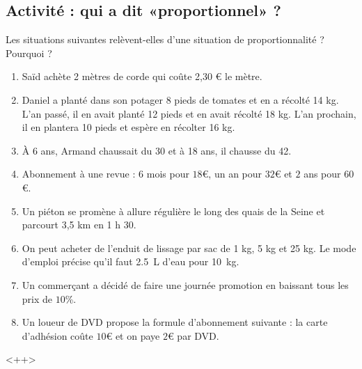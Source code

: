 
\subsection*{Activité : qui a dit «proportionnel» ?}

Les situations suivantes relèvent-elles d’une situation de proportionnalité ? Pourquoi ?
\begin{enumerate}
    \item

 Saïd achète 2 mètres de corde qui coûte 2,30 € le mètre.

\item
 Daniel a planté dans son potager 8 pieds de tomates et en a récolté 14 kg.  L'an passé, il en avait planté 12 pieds et en avait récolté 18 kg. L'an prochain, il en plantera 10 pieds et espère en récolter 16 kg. 

\item
 À 6 ans, Armand chaussait du 30 et à 18 ans, il chausse du 42.
\item

 Abonnement à une revue : \( 6\) mois pour \( 18\)€, un an pour \( 32\)€ et \( 2\) ans pour \( 60\)€.
\item


 Un piéton se promène à allure régulière le long des quais de la Seine et parcourt 3,5 km en 1 h 30.
\item

    On peut acheter de l'enduit de lissage par sac de 1 kg, 5 kg et 25 kg. Le mode d’emploi précise qu'il faut \SI{2.5}{\liter} d’eau pour \SI{10}{\kilo\gram}.
\item

 Un commerçant a décidé de faire une journée promotion en baissant tous les prix de $10$\%.
\item

 Un loueur de DVD propose la formule d'abonnement suivante : la carte d'adhésion coûte $10$€ et on paye $2$€ par DVD.

\end{enumerate}
<++>
